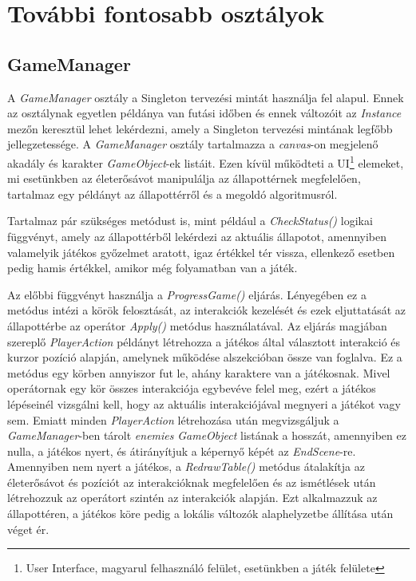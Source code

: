 \documentclass[
]{thesis-ekf}
\theoremstyle{definition}
\theoremstyle{remark}
\begin{document}
\section{További fontosabb osztályok} 

\subsection{GameManager} \label{gamemanager}

A \emph{GameManager} osztály a Singleton tervezési mintát használja fel alapul. Ennek az osztálynak egyetlen példánya van futási időben és ennek változóit az \emph{Instance} mezőn keresztül lehet lekérdezni, amely a Singleton tervezési mintának legfőbb jellegzetessége. A \emph{GameManager} osztály tartalmazza a \emph{canvas}-on megjelenő akadály és karakter \emph{GameObject}-ek listáit. Ezen kívül működteti a UI\footnote{User Interface, magyarul felhasználó felület, esetünkben a játék felülete} elemeket, mi esetünkben az életerősávot manipulálja az állapottérnek megfelelően, tartalmaz egy példányt az állapottérről és a megoldó algoritmusról.

Tartalmaz pár szükséges metódust is, mint például a \emph{CheckStatus()} logikai függvényt, amely az állapottérből lekérdezi az aktuális állapotot, amennyiben valamelyik játékos győzelmet aratott, igaz értékkel tér vissza, ellenkező esetben pedig hamis értékkel, amikor még folyamatban van a játék. 

Az előbbi függvényt használja a \emph{ProgressGame()} eljárás. Lényegében ez a metódus intézi a körök felosztását, az interakciók kezelését és ezek eljuttatását az állapottérbe az operátor \emph{Apply()} metódus használatával. Az eljárás magjában szereplő \emph{PlayerAction} példányt létrehozza a játékos által választott interakció és kurzor pozíció alapján, amelynek működése  alszekcióban össze van foglalva. Ez a metódus egy körben annyiszor fut le, ahány karaktere van a játékosnak. Mivel operátornak egy kör összes interakciója egybevéve felel meg, ezért a játékos lépéseinél vizsgálni kell, hogy az aktuális interakciójával megnyeri a játékot vagy sem. Emiatt minden \emph{PlayerAction} létrehozása után megvizsgáljuk a \emph{GameManager}-ben tárolt \emph{enemies} \emph{GameObject} listának a hosszát, amennyiben ez nulla, a játékos nyert, és átirányítjuk a képernyő képét az \emph{EndScene}-re. Amennyiben nem nyert a játékos, a \emph{RedrawTable()} metódus átalakítja az életerősávot és pozíciót az interakcióknak megfelelően és az ismétlések után létrehozzuk az operátort szintén az interakciók alapján. Ezt alkalmazzuk az állapottéren, a játékos köre pedig a lokális változók alaphelyzetbe állítása után véget ér. 
\end{document}
